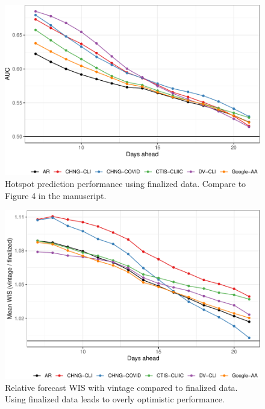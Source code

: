 \documentclass[9pt,twoside,lineno]{pnas-new}
\begin{document}
\clearpage

\begin{figure}

{\centering \includegraphics[width=\textwidth]{fig/hot-finalized-1} 

}

\caption{Hotspot prediction performance using finalized data. Compare to Figure 4 in the manuscript.}\label{fig:hot-finalized}
\end{figure}

\clearpage

\begin{figure}

{\centering \includegraphics[width=\textwidth]{fig/fcast-honest-v-finalized-1} 

}

\caption{Relative forecast WIS with vintage compared to finalized data. Using finalized data leads to overly optimistic performance.}\label{fig:fcast-honest-v-finalized}
\end{figure}
\end{document}
